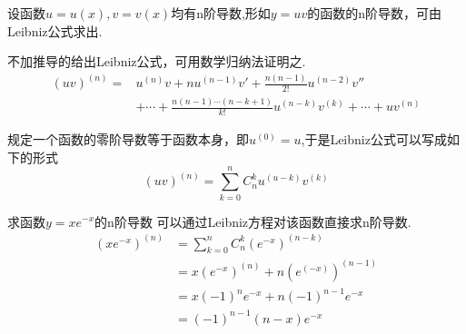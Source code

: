 
设函数$u=u(x),v=v(x)$均有n阶导数,形如$y=uv$的函数的n阶导数，可由Leibniz公式求出.

不加推导的给出Leibniz公式，可用数学归纳法证明之.
\begin{equation}
\begin{aligned}
(uv)^{(n)}=&u^{(n)}v+nu^{(n-1)}v'+\frac{n(n-1)}{2!}u^{(n-2)}v'' \\
&+ \cdots +\frac{n(n-1) \cdots (n-k+1)}{k!}u^{(n-k)}v^{(k)}+\cdots+uv^{(n)}
\end{aligned}
\end{equation}

规定一个函数的零阶导数等于函数本身，即$u^{(0)}=u$,于是Leibniz公式可以写成如下的形式
\begin{equation}
(uv)^{(n)}=\sum_{k=0}^{n} C_{n}^{k}u^{(u-k)}v^{(k)}
\end{equation}

\begin{exam}{求函数$y=xe^{-x}$的n阶导数}
	可以通过Leibniz方程对该函数直接求n阶导数.
	\begin{equation}
	\begin{aligned}
	(xe^{-x})^{(n)}&=\sum_{k=0}^{n} C_{n}^{k}(e^{-x})^{(n-k)}\\
	&=x(e^{-x})^{(n)}+n(e^{(-x)})^{(n-1)}\\
	&=x(-1)^ne^{-x}+n(-1)^{n-1}e^{-x}\\
	&=(-1)^{n-1}(n-x)e^{-x}
	\end{aligned}
	\end{equation}
\end{exam}
